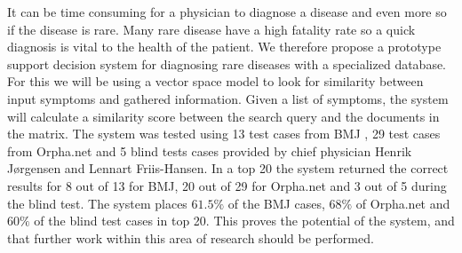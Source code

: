 It can be time consuming for a physician to diagnose a disease and
even more so if the disease is rare. Many rare disease have a high
fatality rate so a quick diagnosis is vital to the health of the
patient. We therefore propose a prototype support decision system for
diagnosing rare diseases with a specialized database. For this we will
be using a vector space model to look for similarity between input
symptoms and gathered information. Given a list of symptoms, the
system will calculate a similarity score between the search query and
the documents in the matrix. The system was tested using 13 test cases
from BMJ \cite{HangwiTang11102006}, 29 test cases from Orpha.net and 5
blind tests cases provided by chief physician Henrik J\o rgensen and
Lennart Friis-Hansen. In a top 20 the system returned the correct
results for 8 out of 13 for BMJ, 20 out of 29 for Orpha.net and 3 out
of 5 during the blind test. The system places $61.5\%$ of the BMJ
cases, $68\%$ of Orpha.net and $60\%$ of the blind test cases in top
20. This proves the potential of the system, and that further work
within this area of research should be performed.
